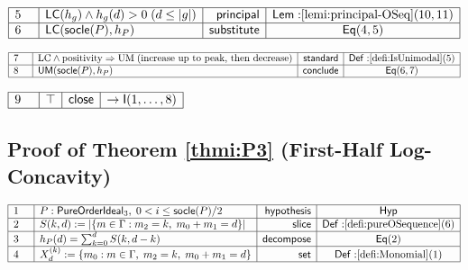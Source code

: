 \documentclass[11pt,reqno]{amsart}
\begin{document}
\nointerlineskip\noindent$%
\begin{array}{|m{0.5cm}|l|r|c|}
\hline
5 & \mathsf{LC}(h_{g})\wedge h_{g}(d)>0\;(d\le|g|) & \mathsf{principal} & 
\mathsf{Lem:}\ref{lemi:principal-OSeq}(10,11) \\ \hline
6 & \mathsf{LC}(\mathsf{socle}(P),h_{P}) & \mathsf{substitute} & \mathsf{Eq}%
(4,5) \\ \hline
\end{array}%
$

\nointerlineskip\noindent$%
\begin{array}{|m{0.5cm}|l|r|c|}
\hline
7 & \text{LC} \wedge \text{positivity}\Rightarrow\text{UM}\;\text{(increase
up to peak, then decrease)} & \mathsf{standard} & \mathsf{Def:}\ref%
{defi:IsUnimodal}(5) \\ \hline
8 & \mathsf{UM}(\mathsf{socle}(P),h_{P}) & \mathsf{conclude} & \mathsf{Eq}%
(6,7) \\ \hline
\end{array}%
$

\nointerlineskip\noindent$%
\begin{array}{|m{0.5cm}|l|r|c|}
\hline
9 & \top & \mathsf{close} & \to\mathsf{I}(1,\dots,8) \\ \hline
\end{array}%
$

\medskip


\subsection*{Proof of Theorem \protect\ref{thmi:P3} (First-Half
Log-Concavity)}

\noindent$%
\begin{array}{|m{0.5cm}|l|r|c|}
\hline
1 & P:\mathsf{PureOrderIdeal}_{3},\;0<i\le\mathsf{socle}(P)/2 & \mathsf{%
hypothesis} & \mathsf{Hyp} \\ \hline
2 & S(k,d):=|\{m\in\Gamma:m_{2}=k,\;m_{0}+m_{1}=d\}| & \mathsf{slice} & 
\mathsf{Def:}\ref{defi:pureOSequence}(6) \\ \hline
3 & h_{P}(d)=\sum_{k=0}^{d}S(k,d-k) & \mathsf{decompose} & \mathsf{Eq}(2) \\ 
\hline
4 & X_{d}^{(k)}:=\{m_{0}:m\in\Gamma,\;m_{2}=k,\;m_{0}+m_{1}=d\} & \mathsf{set%
} & \mathsf{Def:}\ref{defi:Monomial}(1) \\ \hline
\end{array}%
$
\end{document}
